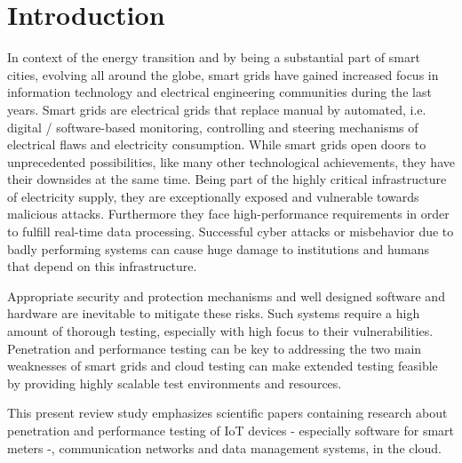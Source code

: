 \section{Introduction}
In context of the energy transition and by being a substantial part of smart cities, evolving all around the globe, smart grids have gained increased focus in information technology and electrical engineering communities during the last years. Smart grids are electrical grids that replace manual by automated, i.e. digital / software-based monitoring, controlling and steering mechanisms of electrical flaws and electricity consumption. While smart grids open doors to unprecedented possibilities, like many other technological achievements, they have their downsides at the same time. Being part of the highly critical infrastructure of electricity supply, they are exceptionally exposed and vulnerable towards malicious attacks. Furthermore they face high-performance requirements in order to fulfill real-time data processing. Successful cyber attacks or misbehavior due to badly performing systems can cause huge damage to institutions and humans that depend on this infrastructure.

Appropriate security and protection mechanisms and well designed software and hardware are inevitable to mitigate these risks. Such systems require a high amount of thorough testing, especially with high focus to their vulnerabilities. Penetration and performance testing can be key to addressing the two main weaknesses of smart grids and cloud testing can make extended testing feasible by providing highly scalable test environments and resources.

This present review study emphasizes scientific papers containing research about penetration and performance testing of IoT devices - especially software for smart meters -, communication networks and data management systems, in the cloud.
